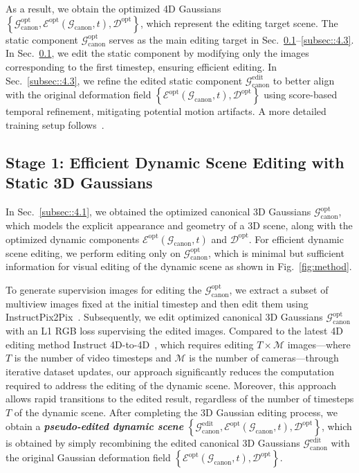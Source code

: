 As a result, we obtain the optimized 4D Gaussians $\left\{\mathcal{G}_{\text{canon}}^\text{opt},\mathcal{E}^\text{opt}(\mathcal{G}_{\text{canon}}, t), \mathcal{D}^\text{opt}\right\}$, which represent the editing target scene. The static component $\mathcal{G}_{\text{canon}}^\text{opt}$ serves as the main editing target in Sec.~\ref{subsec::4.2}--\ref{subsec::4.3}. In Sec.~\ref{subsec::4.2}, we edit the static component by modifying only the images corresponding to the first timestep, ensuring efficient editing. In Sec.~\ref{subsec::4.3}, we refine the edited static component $\mathcal{G}_{\text{canon}}^\text{edit}$ to better align with the original deformation field $\left\{\mathcal{E}^\text{opt}(\mathcal{G}_{\text{canon}}, t),\mathcal{D}^\text{opt}\right\}$ using score-based temporal refinement, mitigating potential motion artifacts. A more detailed training setup follows~\cite{ref_10_4dgs}.


\subsection{Stage 1: Efficient Dynamic Scene Editing with Static 3D Gaussians}
\label{subsec::4.2}
In Sec.~\ref{subsec::4.1}, we obtained the optimized canonical 3D Gaussians $\mathcal{G}_{\text{canon}}^\text{opt}$, which models the explicit appearance and geometry of a 3D scene, along with the optimized dynamic components $\mathcal{E}^\text{opt}(\mathcal{G}_{\text{canon}}, t)$ and $\mathcal{D}^\text{opt}$. For efficient dynamic scene editing, we perform editing only on $\mathcal{G}_{\text{canon}}^\text{opt}$, which is minimal but sufficient information for visual editing of the dynamic scene as shown in Fig.~\ref{fig:method}.


To generate supervision images for editing the $\mathcal{G}_{\text{canon}}^\text{opt}$, we extract a subset of multiview images fixed at the initial timestep and then edit them using InstructPix2Pix~\cite{ref_1_ip2p}. Subsequently, we edit optimized canonical 3D Gaussians $\mathcal{G}_{\text{canon}}^\text{opt}$ with an L1 RGB loss supervising the edited images. Compared to the latest 4D editing method Instruct 4D-to-4D~\cite{ref_9_i4d24d}, which requires editing $T\!\times\!\mathcal{M}$ images---where $T$ is the number of video timesteps and $\mathcal{M}$ is the number of cameras---through iterative dataset updates, our approach significantly reduces the computation required to address the editing of the dynamic scene. Moreover, this approach allows rapid transitions to the edited result, regardless of the number of timesteps $T$ of the dynamic scene. After completing the 3D Gaussian editing process, we obtain a \textbf{\textit{pseudo-edited dynamic scene}} $\left\{\mathcal{G}_{\text{canon}}^\text{edit},\mathcal{E}^\text{opt}(\mathcal{G}_{\text{canon}}, t), \mathcal{D}^\text{opt}\right\}$, which is obtained by simply recombining the edited canonical 3D Gaussians $\mathcal{G}_{\text{canon}}^\text{edit}$ with the original Gaussian deformation field $\left\{\mathcal{E}^\text{opt}(\mathcal{G}_{\text{canon}}, t), \mathcal{D}^\text{opt}\right\}$.


